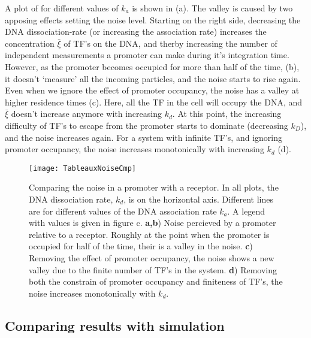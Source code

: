 A plot of  for different values of $k_a$ is shown in  (a). The valley is caused by two apposing effects setting the noise level. Starting on the right side, decreasing the DNA dissociation-rate (or increasing the association rate) increases the concentration $\bar{\xi}$ of TF's on the DNA, and therby increasing the number of independent measurements a promoter can make during it's integration time. However, as the promoter becomes occupied for more than half of the time,  (b), it doesn't `measure' all the incoming particles, and the noise starts to rise again. Even when we ignore the effect of promoter occupancy, the noise has a valley at higher residence times (c). Here, all the TF in the cell will occupy the DNA, and $\bar{\xi}$ doesn't increase anymore with increasing $k_d$. At this point, the increasing difficulty of TF's to escape from the promoter starts to dominate (decreasing $k_D$), and the noise increases again. For a system with infinite TF's, and ignoring promoter occupancy, the noise increases monotonically with increasing $k_d$ (d). 

\begin{figure}
\texttt{[image: TableauxNoiseCmp]}
\caption{ Comparing the noise in a promoter with a receptor. In all plots, the DNA dissociation rate, $k_d$, is on the horizontal axis. Different lines are for different values of the DNA association rate $k_a$. A legend with values is given in figure c. {\bf a,b}) Noise percieved by a promoter relative to a receptor. Roughly at the point when the promoter is occupied for half of the time, their is a valley in the noise. {\bf c}) Removing the effect of promoter occupancy, the noise shows a new valley due to the finite number of TF's in the system. {\bf d}) Removing both the constrain of promoter occupancy and finiteness of TF's, the noise increases monotonically with $k_d$.
}
\end{figure}



\subsection{Comparing results with simulation}

